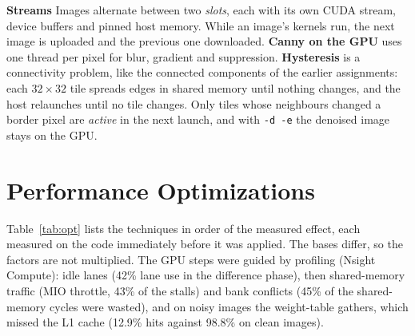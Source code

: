\documentclass[10pt,a4paper]{article}
\begin{document}
\textbf{Streams} Images alternate between two \emph{slots}, each with its own CUDA stream, device buffers and pinned host memory.
While an image's kernels run, the next image is uploaded and the previous one downloaded. \textbf{Canny on the GPU} uses one thread
per pixel for blur, gradient and suppression. \textbf{Hysteresis} is a connectivity problem, like the connected components of the
earlier assignments: each $32\times32$ tile spreads edges in shared memory until nothing changes, and the host relaunches until no
tile changes. Only tiles whose neighbours changed a border pixel are \emph{active} in the next launch, and with \texttt{-d -e} the
denoised image stays on the GPU.

\section{Performance Optimizations}\label{sec:opt}
Table~\ref{tab:opt} lists the techniques in order of the measured effect, each measured on the code immediately before it was applied.
The bases differ, so the factors are not multiplied. The GPU steps were guided by profiling (Nsight Compute): idle lanes (42\% lane
use in the difference phase), then shared-memory traffic (MIO throttle, 43\% of the stalls) and bank conflicts (45\% of the
shared-memory cycles were wasted), and on noisy images the weight-table gathers, which missed the L1 cache (12.9\% hits against 98.8\%
on clean images).
\end{document}
